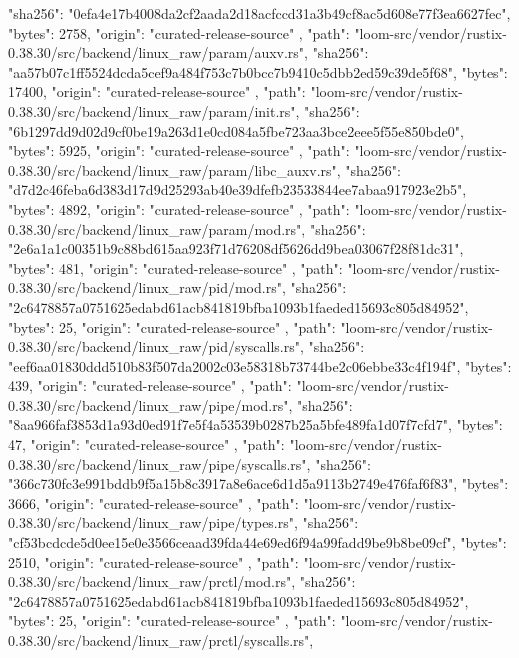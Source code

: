 {{      "sha256": "0efa4e17b4008da2cf2aada2d18acfccd31a3b49cf8ac5d608e77f3ea6627fec",
      "bytes": 2758,
      "origin": "curated-release-source"
    },
    {
      "path": "loom-src/vendor/rustix-0.38.30/src/backend/linux_raw/param/auxv.rs",
      "sha256": "aa57b07c1ff5524dcda5cef9a484f753c7b0bcc7b9410c5dbb2ed59c39de5f68",
      "bytes": 17400,
      "origin": "curated-release-source"
    },
    {
      "path": "loom-src/vendor/rustix-0.38.30/src/backend/linux_raw/param/init.rs",
      "sha256": "6b1297dd9d02d9cf0be19a263d1e0cd084a5fbe723aa3bce2eee5f55e850bde0",
      "bytes": 5925,
      "origin": "curated-release-source"
    },
    {
      "path": "loom-src/vendor/rustix-0.38.30/src/backend/linux_raw/param/libc_auxv.rs",
      "sha256": "d7d2c46feba6d383d17d9d25293ab40e39dfefb23533844ee7abaa917923e2b5",
      "bytes": 4892,
      "origin": "curated-release-source"
    },
    {
      "path": "loom-src/vendor/rustix-0.38.30/src/backend/linux_raw/param/mod.rs",
      "sha256": "2e6a1a1c00351b9c88bd615aa923f71d76208df5626dd9bea03067f28f81dc31",
      "bytes": 481,
      "origin": "curated-release-source"
    },
    {
      "path": "loom-src/vendor/rustix-0.38.30/src/backend/linux_raw/pid/mod.rs",
      "sha256": "2c6478857a0751625edabd61acb841819bfba1093b1faeded15693c805d84952",
      "bytes": 25,
      "origin": "curated-release-source"
    },
    {
      "path": "loom-src/vendor/rustix-0.38.30/src/backend/linux_raw/pid/syscalls.rs",
      "sha256": "eef6aa01830ddd510b83f507da2002c03e58318b73744be2c06ebbe33c4f194f",
      "bytes": 439,
      "origin": "curated-release-source"
    },
    {
      "path": "loom-src/vendor/rustix-0.38.30/src/backend/linux_raw/pipe/mod.rs",
      "sha256": "8aa966faf3853d1a93d0ed91f7e5f4a53539b0287b25a5bfe489fa1d07f7cfd7",
      "bytes": 47,
      "origin": "curated-release-source"
    },
    {
      "path": "loom-src/vendor/rustix-0.38.30/src/backend/linux_raw/pipe/syscalls.rs",
      "sha256": "366c730fc3e991bddb9f5a15b8c3917a8e6ace6d1d5a9113b2749e476faf6f83",
      "bytes": 3666,
      "origin": "curated-release-source"
    },
    {
      "path": "loom-src/vendor/rustix-0.38.30/src/backend/linux_raw/pipe/types.rs",
      "sha256": "cf53bcdcde5d0ee15e0e3566ceaad39fda44e69ed6f94a99fadd9be9b8be09cf",
      "bytes": 2510,
      "origin": "curated-release-source"
    },
    {
      "path": "loom-src/vendor/rustix-0.38.30/src/backend/linux_raw/prctl/mod.rs",
      "sha256": "2c6478857a0751625edabd61acb841819bfba1093b1faeded15693c805d84952",
      "bytes": 25,
      "origin": "curated-release-source"
    },
    {
      "path": "loom-src/vendor/rustix-0.38.30/src/backend/linux_raw/prctl/syscalls.rs",
}}
